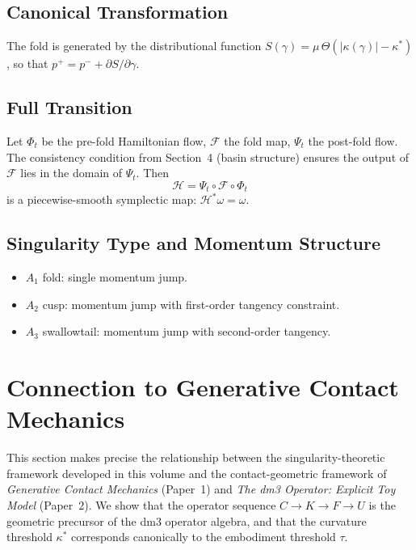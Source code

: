 \documentclass[12pt, oneside]{book}
\theoremstyle{plain}
\theoremstyle{definition}
\theoremstyle{remark}
\begin{document}
\subsection{Canonical Transformation}

The fold is generated by the distributional function
$S(\gamma) = \mu\,\Theta(|\kappa(\gamma)| - \kappa^*)$, so that
$p^+ = p^- + \partial S/\partial\gamma$.

\subsection{Full Transition}

Let $\Phi_t$ be the pre-fold Hamiltonian flow, $\mathcal{F}$ the fold
map, $\Psi_t$ the post-fold flow. The consistency condition from
Section~4 (basin structure) ensures the output of $\mathcal{F}$ lies
in the domain of $\Psi_t$. Then
\[
\mathcal{H} = \Psi_t \circ \mathcal{F} \circ \Phi_t
\]
is a piecewise-smooth symplectic map: $\mathcal{H}^*\omega = \omega$.

\subsection{Singularity Type and Momentum Structure}

\begin{itemize}
\item $A_1$ fold: single momentum jump.
\item $A_2$ cusp: momentum jump with first-order tangency constraint.
\item $A_3$ swallowtail: momentum jump with second-order tangency.
\end{itemize}

\section{Connection to Generative Contact Mechanics}
\label{sec:connection}

This section makes precise the relationship between the
singularity-theoretic framework developed in this volume and the
contact-geometric framework of \emph{Generative Contact Mechanics}
(Paper~1) and \emph{The dm3 Operator: Explicit Toy Model}
(Paper~2). We show that the operator sequence
$C \to K \to F \to U$
is the geometric precursor of the dm3 operator algebra, and that the
curvature threshold $\kappa^*$ corresponds canonically to the
embodiment threshold $\tau$.
\end{document}

